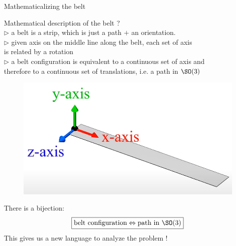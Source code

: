 \documentclass[9pt]{beamer}
\renewcommand{\emph}{\alert}
\begin{document}
\begin{frame}{Mathematicalizing the belt}

    Mathematical description of the belt ?\\[0.3cm]
    \quad $\triangleright$ a belt is a strip, which is just a \emph{path} $+$ an \emph{orientation}.\\[0.2cm]
    \quad $\triangleright$ given axis on the middle line along the belt, each set of axis \\ \hspace{0.5cm} is related by a rotation \\[0.2cm]
    \quad $\triangleright$ a belt configuration is equivalent to a continuous set of axis and \\ \hspace{0.5cm} therefore to a continuous set of translations, i.e. a \emph{path in $\SO(3)$}
    \begin{figure}
        \centering
        \includegraphics[scale=0.12]{Pictures/beltaxis.png}
    \end{figure}
    There is a bijection:
    \begin{equation*}
        \boxed{\text{belt configuration} \Leftrightarrow \text{path in $\SO(3)$}}
    \end{equation*}
    This gives us a new language to analyze the problem !

\end{frame}
\end{document}
